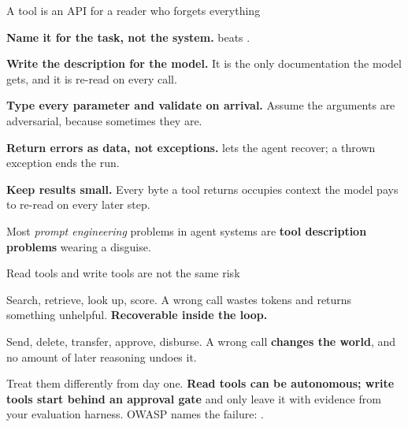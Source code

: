 \documentclass[aspectratio=169,11pt,t]{beamer}
\begin{document}
\begin{frame}[shrink=25]{A tool is an API for a reader who forgets everything}
\begin{isteps}
\item \textbf{Name it for the task, not the system.}  beats .
\item \textbf{Write the description for the model.} It is the only documentation the model gets, and it is re-read on every call.
\item \textbf{Type every parameter and validate on arrival.} Assume the arguments are adversarial, because sometimes they are.
\item \textbf{Return errors as data, not exceptions.}  lets the agent recover; a thrown exception ends the run.
\item \textbf{Keep results small.} Every byte a tool returns occupies context the model pays to re-read on every later step.
\end{isteps}
{\fontsize{9.4}{12.6}\selectfont\color{fg2}Most \textit{prompt engineering} problems in agent systems are \textbf{tool description problems} wearing a disguise.\par}\vskip 4pt
\end{frame}

\begin{frame}[shrink=25]{Read tools and write tools are not the same risk}
\begin{minipage}[t]{0.494\textwidth}
\begin{icardgood}
Search, retrieve, look up, score. A wrong call wastes tokens and returns something unhelpful. \textbf{Recoverable inside the loop.}
\end{icardgood}
\end{minipage}%
\hfill
\begin{minipage}[t]{0.494\textwidth}
\begin{icardbad}
Send, delete, transfer, approve, disburse. A wrong call \textbf{changes the world}, and no amount of later reasoning undoes it.
\end{icardbad}
\end{minipage}%
\begin{iband}[amber]
Treat them differently from day one. \textbf{Read tools can be autonomous; write tools start behind an approval gate} and only leave it with evidence from your evaluation harness. OWASP names the failure: .
\end{iband}
\end{frame}
\end{document}
